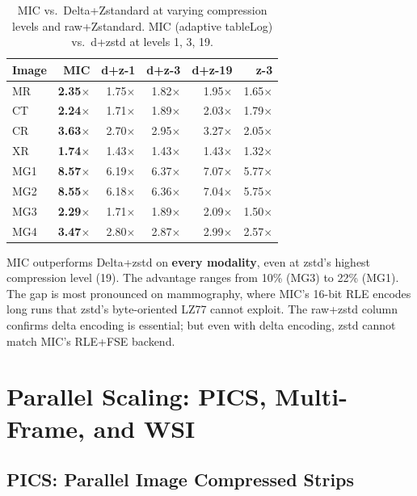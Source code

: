 \documentclass[10pt,twocolumn]{article}
\begin{document}
\begin{table}[h]
  \centering
  \caption{MIC vs.\ Delta+Zstandard at varying compression levels and raw+Zstandard. MIC (adaptive tableLog) vs.\ d+zstd at levels 1, 3, 19.}
  \label{tab:zstd}
  \small
  \setlength{\tabcolsep}{3pt}
  \begin{tabular}{lrrrrr}
    \toprule
    Image & MIC & d+z-1 & d+z-3 & d+z-19 & z-3 \\
    \midrule
    MR  & \textbf{2.35$\times$} & 1.75$\times$ & 1.82$\times$ & 1.95$\times$ & 1.65$\times$ \\
    CT  & \textbf{2.24$\times$} & 1.71$\times$ & 1.89$\times$ & 2.03$\times$ & 1.79$\times$ \\
    CR  & \textbf{3.63$\times$} & 2.70$\times$ & 2.95$\times$ & 3.27$\times$ & 2.05$\times$ \\
    XR  & \textbf{1.74$\times$} & 1.43$\times$ & 1.43$\times$ & 1.43$\times$ & 1.32$\times$ \\
    MG1 & \textbf{8.57$\times$} & 6.19$\times$ & 6.37$\times$ & 7.07$\times$ & 5.77$\times$ \\
    MG2 & \textbf{8.55$\times$} & 6.18$\times$ & 6.36$\times$ & 7.04$\times$ & 5.75$\times$ \\
    MG3 & \textbf{2.29$\times$} & 1.71$\times$ & 1.89$\times$ & 2.09$\times$ & 1.50$\times$ \\
    MG4 & \textbf{3.47$\times$} & 2.80$\times$ & 2.87$\times$ & 2.99$\times$ & 2.57$\times$ \\
    \bottomrule
  \end{tabular}
\end{table}

MIC outperforms Delta+zstd on \textbf{every modality}, even at zstd's highest compression level (19). The advantage ranges from 10\% (MG3) to 22\% (MG1). The gap is most pronounced on mammography, where MIC's 16-bit RLE encodes long runs that zstd's byte-oriented LZ77 cannot exploit. The raw+zstd column confirms delta encoding is essential; but even with delta encoding, zstd cannot match MIC's RLE+FSE backend.

\section{Parallel Scaling: PICS, Multi-Frame, and WSI}
\label{sec:parallel}

\subsection{PICS: Parallel Image Compressed Strips}
\end{document}
